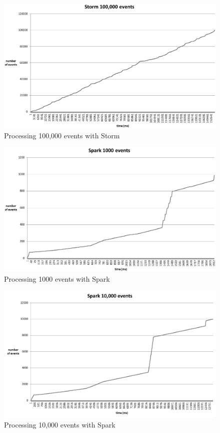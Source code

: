 \begin{figure}
  \centering
  \includegraphics [width=1.1\textwidth]{images/storm100000}
  \caption{Processing 100,000 events with Storm}
  \label{fig:storm100000}
\end{figure}

\begin{figure}
  \centering
  \includegraphics [width=1.1\textwidth]{images/spark1000}
  \caption{Processing 1000 events with Spark}
  \label{fig:spark1000}
\end{figure}

\begin{figure}
  \centering
  \includegraphics [width=1.1\textwidth]{images/spark10000}
  \caption{Processing 10,000 events with Spark}
  \label{fig:spark10000}
\end{figure}

